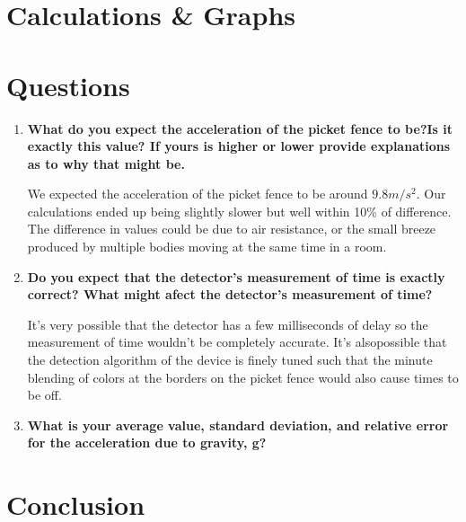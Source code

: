 \documentclass[a4paper,12pt]{article}
\begin{document}




\section{Calculations \& Graphs}

\vspace{-0.5cm}
\singlespacing




 \section{Questions}

\vspace{-0.5cm}
\singlespacing

\begin{enumerate}
	\item \textbf{What do you expect the acceleration of the picket fence to be?Is it exactly this value? If yours is higher or lower provide explanations as to why that might be.}

		We expected the acceleration of the picket fence to be around $9.8 {m/s^2}$. Our calculations ended up being slightly slower but well within 10\% of difference. The difference in values could be due to air resistance, or the small breeze produced by multiple bodies moving at the same time in a room.

	\item \textbf{Do you expect that the detector's measurement of time is exactly correct? What might afect the detector's measurement of time?}

	It's very possible that the detector has a few milliseconds of delay so the measurement of time wouldn't be completely accurate. It's alsopossible that the detection algorithm of the device is finely tuned such that the minute blending of colors at the borders on the picket fence would also cause times to be off.

	\item \textbf{What is your average value, standard deviation, and relative error for the acceleration due to gravity, g?}

	
\end{enumerate}






\section{Conclusion}

\vspace{-0.5cm}
\singlespacing
\end{document}
